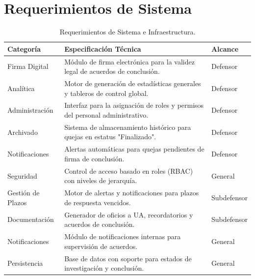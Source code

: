 \section{Requerimientos de Sistema}
\begin{table}[h!]
\centering
\caption{Requerimientos de Sistema e Infraestructura.}
\label{tab:sys_req}
\begin{tabular}{@{} p{3cm} p{8.5cm} l @{}}
\toprule
\rowcolor[HTML]{2D3E50} 
\textbf{\color[HTML]{FFFFFF} Categoría} & \textbf{\color[HTML]{FFFFFF} Especificación Técnica} & \textbf{\color[HTML]{FFFFFF} Alcance} \\ \midrule
\rowcolor[HTML]{F2F4F7} 
Firma Digital & Módulo de firma electrónica para la validez legal de acuerdos de conclusión. & Defensor \\
Analítica & Motor de generación de estadísticas generales y tableros de control global. & Defensor \\
\rowcolor[HTML]{F2F4F7} 
Administración & Interfaz para la asignación de roles y permisos del personal administrativo. & Defensor \\
Archivado & Sistema de almacenamiento histórico para quejas en estatus "Finalizado". & Defensor \\
\rowcolor[HTML]{F2F4F7} 
Notificaciones & Alertas automáticas para quejas pendientes de firma de conclusión. & Defensor \\ \bottomrule
Seguridad & Control de acceso basado en roles (RBAC) con niveles de jerarquía. & General \\
Gestión de Plazos & Motor de alertas y notificaciones para plazos de respuesta vencidos. & Subdefensor \\
\rowcolor[HTML]{F2F4F7} 
Documentación & Generador de oficios a UA, recordatorios y acuerdos de conclusión. & Subdefensor \\
Notificaciones & Módulo de notificaciones internas para supervisión de acuerdos. & General \\
\rowcolor[HTML]{F2F4F7} 
Persistencia & Base de datos con soporte para estados de investigación y conclusión. & General \\ \bottomrule

\end{tabular}
\end{table}